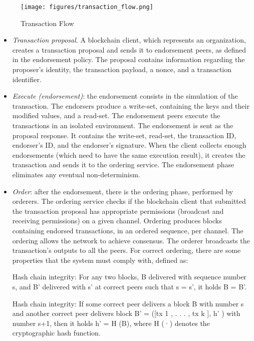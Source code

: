 \documentclass[12pt,a4paper]{article}
\theoremstyle{definition}
\begin{document}
\begin{figure}[h]

\texttt{[image: figures/transaction\_flow.png]}
\centering
\caption{Transaction Flow \cite{transaction_flow}}
\label{fig: Fabric's Transaction Flow}
\end{figure}

\begin{itemize}
\item \emph{Transaction proposal}. A blockchain client, which represents an organization, creates a transaction proposal and sends it to endorsement peers, as defined in the endorsement policy. The proposal contains information regarding the proposer's identity, the transaction payload, a nonce, and a transaction identifier.
\item \emph{{Execute} (endorsement)}: the endorsement consists in the simulation of the transaction. The endorsers produce a write-set,  containing the keys and their modified values, and a read-set.  The endorsement peers execute the transactions in an isolated environment. The endorsement is sent as the proposal response. It contains the write-set, read-set, the transaction ID, endorser's ID, and the endorser's signature. When the client collects enough endorsements (which need to have the same execution result), it creates the transaction and sends it to the ordering service. The endorsement phase eliminates any eventual non-determinism.

\item \emph{{Order}}: after the endorsement, there is the ordering phase, performed by orderers. The ordering service checks if the blockchain client that submitted the transaction proposal has appropriate permissions (broadcast and receiving permissions) on a given channel. Ordering produces blocks containing endorsed transactions, in an ordered sequence, per channel. The ordering allows the network to achieve consensus. The orderer broadcasts the transaction's outputs to all the peers. For correct ordering, there are some properties that the system must comply with, defined as:

\begin{mydef}{Hash chain integrity:}
For any two blocks, B delivered with sequence number s, and B' delivered with s' at correct peers such that s = s',
it holds B = B'.
\end{mydef}

\begin{mydef}{Hash chain integrity:}
If some correct peer delivers a block B
with number s and another correct peer delivers block B' =
([tx 1 , . . . , tx k ], h' ) with number s+1, then it holds h' = H (B),
where H (·) denotes the cryptographic hash function.
\end{mydef}


\end{itemize}
\end{document}
